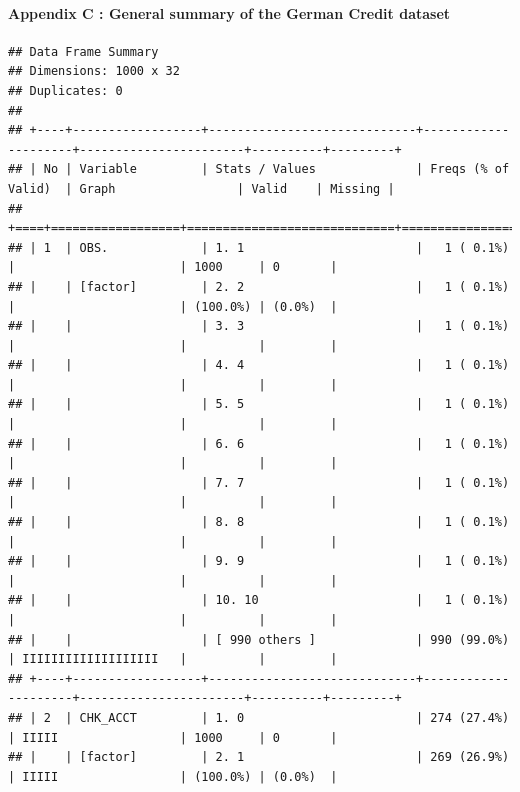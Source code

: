 \documentclass[
]{article}
\begin{document}
\hypertarget{appendix-c-general-summary-of-the-german-credit-dataset}{%
\paragraph{Appendix C : General summary of the German Credit
dataset}\label{appendix-c-general-summary-of-the-german-credit-dataset}}

\begin{verbatim}
## Data Frame Summary  
## Dimensions: 1000 x 32  
## Duplicates: 0  
## 
## +----+------------------+-----------------------------+---------------------+-----------------------+----------+---------+
## | No | Variable         | Stats / Values              | Freqs (% of Valid)  | Graph                 | Valid    | Missing |
## +====+==================+=============================+=====================+=======================+==========+=========+
## | 1  | OBS.             | 1. 1                        |   1 ( 0.1%)         |                       | 1000     | 0       |
## |    | [factor]         | 2. 2                        |   1 ( 0.1%)         |                       | (100.0%) | (0.0%)  |
## |    |                  | 3. 3                        |   1 ( 0.1%)         |                       |          |         |
## |    |                  | 4. 4                        |   1 ( 0.1%)         |                       |          |         |
## |    |                  | 5. 5                        |   1 ( 0.1%)         |                       |          |         |
## |    |                  | 6. 6                        |   1 ( 0.1%)         |                       |          |         |
## |    |                  | 7. 7                        |   1 ( 0.1%)         |                       |          |         |
## |    |                  | 8. 8                        |   1 ( 0.1%)         |                       |          |         |
## |    |                  | 9. 9                        |   1 ( 0.1%)         |                       |          |         |
## |    |                  | 10. 10                      |   1 ( 0.1%)         |                       |          |         |
## |    |                  | [ 990 others ]              | 990 (99.0%)         | IIIIIIIIIIIIIIIIIII   |          |         |
## +----+------------------+-----------------------------+---------------------+-----------------------+----------+---------+
## | 2  | CHK_ACCT         | 1. 0                        | 274 (27.4%)         | IIIII                 | 1000     | 0       |
## |    | [factor]         | 2. 1                        | 269 (26.9%)         | IIIII                 | (100.0%) | (0.0%)  |

\end{verbatim}
\end{document}
